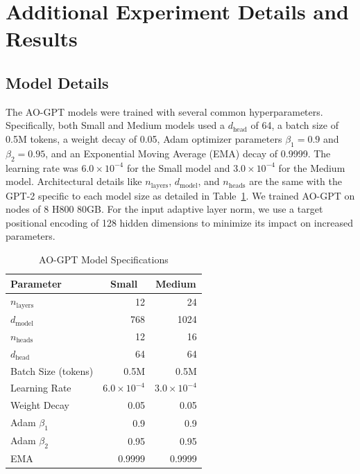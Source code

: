 \section{Additional Experiment Details and Results}
\label{sec:add exp}


\subsection{Model Details}

The AO-GPT models were trained with several common hyperparameters. Specifically, both Small and Medium models used a $d_{\text{head}}$ of 64, a batch size of 0.5M tokens, a weight decay of 0.05, Adam optimizer parameters $\beta_1=0.9$ and $\beta_2=0.95$, and an Exponential Moving Average (EMA) decay of 0.9999. The learning rate was $6.0 \times 10^{-4}$ for the Small model and $3.0 \times 10^{-4}$ for the Medium model. Architectural details like $n_{\text{layers}}$, $d_{\text{model}}$, and $n_{\text{heads}}$ are the same with the GPT-2 specific to each model size as detailed in Table~\ref{tab:ao-models}. We trained AO-GPT on nodes of 8 H800 80GB. For the input adaptive layer norm, we use a target positional encoding of 128 hidden dimensions to minimize its impact on increased parameters.


\begin{table}
  \caption{AO-GPT Model Specifications}
  \label{tab:ao-models}
  \centering
  \begin{tabular}{lrr}
    \toprule
    Parameter & \multicolumn{1}{c}{Small} & \multicolumn{1}{c}{Medium} \\
    \midrule
    $n_{\text{layers}}$ & 12      & 24      \\
    $d_{\text{model}}$  & 768     & 1024    \\
    $n_{\text{heads}}$  & 12      & 16      \\
    $d_{\text{head}}$   & 64      & 64      \\
    Batch Size (tokens)        & 0.5M    & 0.5M    \\
    Learning Rate      & $6.0 \times 10^{-4}$ & $3.0 \times 10^{-4}$ \\
    Weight Decay & 0.05 & 0.05 \\
    Adam $\beta_1$ & 0.9 & 0.9 \\
    Adam $\beta_2$ & 0.95 & 0.95 \\
    EMA & 0.9999 & 0.9999 \\
    \bottomrule
  \end{tabular}
\end{table}


